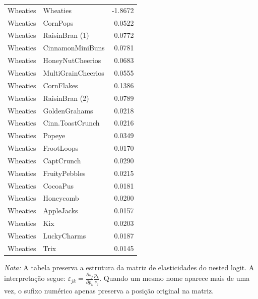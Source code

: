 \begin{table}[H]
\begin{tabular}{llr}
Wheaties & Wheaties & -1.8672 \\
Wheaties & CornPops & 0.0522 \\
Wheaties & RaisinBran (1) & 0.0772 \\
Wheaties & CinnamonMiniBuns & 0.0781 \\
Wheaties & HoneyNutCheerios & 0.0683 \\
Wheaties & MultiGrainCheerios & 0.0555 \\
Wheaties & CornFlakes & 0.1386 \\
Wheaties & RaisinBran (2) & 0.0789 \\
Wheaties & GoldenGrahams & 0.0218 \\
Wheaties & Cinn.ToastCrunch & 0.0216 \\
Wheaties & Popeye & 0.0349 \\
Wheaties & FrootLoops & 0.0170 \\
Wheaties & CaptCrunch & 0.0290 \\
Wheaties & FruityPebbles & 0.0215 \\
Wheaties & CocoaPus & 0.0181 \\
Wheaties & Honeycomb & 0.0200 \\
Wheaties & AppleJacks & 0.0157 \\
Wheaties & Kix & 0.0203 \\
Wheaties & LuckyCharms & 0.0187 \\
Wheaties & Trix & 0.0145 \\
\bottomrule
\end{tabular}

\vspace{0.3em}
\footnotesize
\textit{Nota:} A tabela preserva a estrutura da matriz de elasticidades do nested logit. A interpretação segue: $\varepsilon_{jk}=\frac{\partial s_j}{\partial p_k}\frac{p_k}{s_j}$. Quando um mesmo nome aparece mais de uma vez, o sufixo numérico apenas preserva a posição original na matriz.
\end{table}
\endgroup


